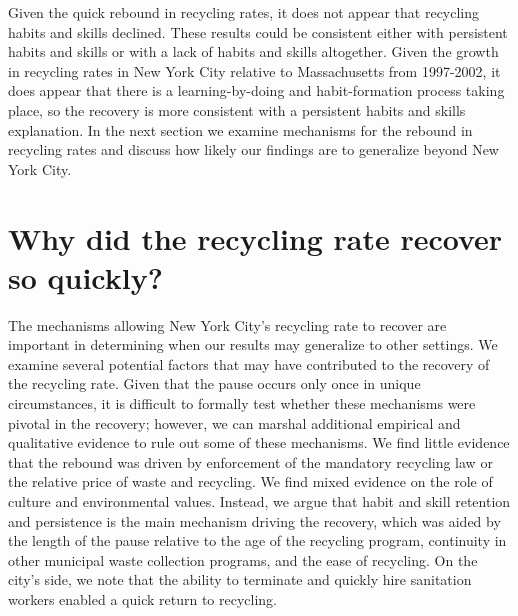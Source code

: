 \documentclass[12pt]{article}
\begin{document}
Given the quick rebound in recycling rates, it does not appear that recycling habits and skills declined.  These results could be consistent either with persistent habits and skills or with a lack of habits and skills altogether.  Given the growth in recycling rates in New York City relative to Massachusetts from 1997-2002, it does appear that there is a learning-by-doing and habit-formation process taking place, so the recovery is more consistent with a persistent habits and skills explanation.  In the next section we examine mechanisms for the rebound in recycling rates and discuss how likely our findings are to generalize beyond New York City.

\section{Why did the recycling rate recover so quickly?}

The mechanisms allowing New York City's recycling rate to recover are important in determining when our results may generalize to other settings.  We examine several potential factors that may have contributed to the recovery of the recycling rate.  Given that the pause occurs only once in unique circumstances, it is difficult to formally test whether these mechanisms were pivotal in the recovery; however, we can marshal additional empirical and qualitative evidence to rule out some of these mechanisms.  We find little evidence that the rebound was driven by enforcement of the mandatory recycling law or the relative price of waste and recycling.  We find mixed evidence on the role of culture and environmental values.  Instead, we argue that habit and skill retention and persistence is the main mechanism driving the recovery, which was aided by the length of the pause relative to the age of the recycling program, continuity in other municipal waste collection programs, and the ease of recycling.  On the city's side, we note that the ability to terminate and quickly hire sanitation workers enabled a quick return to recycling.
\end{document}
